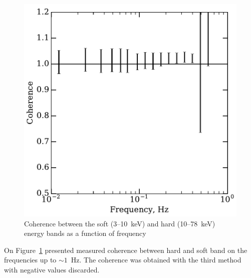 \documentclass[a4paper,fleqn,usenatbib]{mnras}
\begin{document}
\begin{figure}
    \includegraphics[width=\columnwidth]{coherence_grs.pdf}
    \caption{Coherence between the soft (3--10~keV) and hard (10--78~keV) energy bands as a function of frequency} 
    \label{fig:coherence}
\end{figure}


On Figure~\ref{fig:coherence} presented measured coherence between hard and soft band on the frequencies up to $\sim1$~Hz. 
The coherence was obtained with the third method with negative values discarded. 

\end{document}
